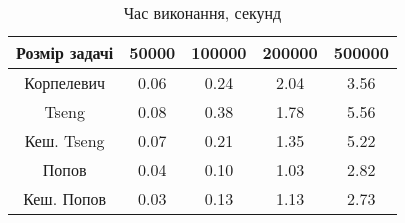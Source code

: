 \begin{table}[H]
	\centering
	\begin{tabular}{|c||c|c|c|c|}\hline
		Розмір задачі & 50000 & 100000 & 200000 & 500000 \\ \hline \hline
		Корпелевич & 0.06 & 0.24 & 2.04 & 3.56 \\ \hline
		Tseng & 0.08 & 0.38 & 1.78 & 5.56 \\ \hline
		Кеш. Tseng & 0.07 & 0.21 & 1.35 & 5.22 \\ \hline
		Попов & 0.04 & 0.10 & 1.03 & 2.82 \\ \hline
		Кеш. Попов & 0.03 & 0.13 & 1.13 & 2.73 \\ \hline
	\end{tabular}
	\caption{Час виконання, секунд}
\end{table}
